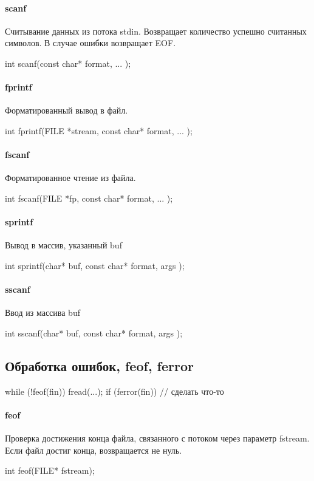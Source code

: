 \paragraph{scanf}
Считывание данных из потока stdin. Возвращает количество успешно считанных символов. В случае ошибки возвращает EOF.
\begin{ccode}
int scanf(const char* format, ... );
\end{ccode}
\paragraph{fprintf}
Форматированный вывод в файл.
\begin{ccode}
int fprintf(FILE *stream, const char* format, ... );
\end{ccode}
\paragraph{fscanf}
Форматированное чтение из файла.
\begin{ccode}
int fscanf(FILE *fp, const char* format, ... );
\end{ccode}
\paragraph{sprintf}
Вывод в массив, указанный buf
\begin{ccode}
int sprintf(char* buf, const char* format, args );
\end{ccode}
\paragraph{sscanf}
Ввод из массива buf
\begin{ccode}
int sscanf(char* buf, const char* format, args );
\end{ccode}
\subsection{Обработка ошибок,  feof, ferror}\label{subsec:quection8_err}
\begin{ccode}
while (!feof(fin)) {
    fread(...);
    if (ferror(fin)) {
	// сделать что-то
    }
}
\end{ccode}
\paragraph{feof}
Проверка достижения конца файла, связанного с потоком через параметр fstream. Если файл достиг конца, возвращается не нуль.
\begin{ccode}
int feof(FILE* fstream);
\end{ccode}
